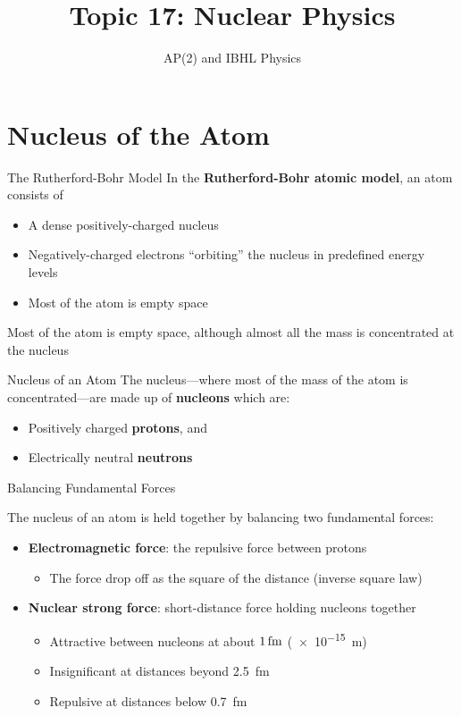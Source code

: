 \documentclass[12pt,compress,aspectratio=169]{beamer}
\title{Topic 17: Nuclear Physics}
\subtitle{AP(2) and IBHL Physics}
\begin{document}
\begin{frame}
  \titlepage
\end{frame}



\section{Nucleus of the Atom}

\begin{frame}{The Rutherford-Bohr Model}
  In the \textbf{Rutherford-Bohr atomic model}, an atom consists of
  \begin{itemize}
  \item A dense positively-charged nucleus
  \item Negatively-charged electrons ``orbiting'' the nucleus in predefined
    energy levels
  \item Most of the atom is empty space
  \end{itemize}
  Most of the atom is empty space, although almost all the mass is concentrated
  at the nucleus
\end{frame}



\begin{frame}{Nucleus of an Atom}
  The nucleus---where most of the mass of the atom is concentrated---are made
  up of \textbf{nucleons} which are:
  \begin{itemize}
  \item Positively charged \textbf{protons}, and 
  \item Electrically neutral \textbf{neutrons}
  \end{itemize}
\end{frame}



\begin{frame}{Balancing Fundamental Forces}
  \begin{center}
  \end{center}
  The nucleus of an atom is held together by balancing two fundamental forces:
  \begin{itemize}
  \item\textbf{Electromagnetic force}: the repulsive force between protons
    \begin{itemize}
    \item The force drop off as the square of the distance (inverse square law)
    \end{itemize}
  \item\textbf{Nuclear strong force}: short-distance force
    holding nucleons together
    \begin{itemize}
    \item Attractive between nucleons at about $\SI1{\femto\metre}$
      (\SI{e-15}{\metre})
    \item Insignificant at distances beyond \SI{2.5}{\femto\metre}
    \item  Repulsive at distances below \SI{.7}{\femto\metre}
    \end{itemize}
  \end{itemize}
\end{frame}
\end{document}
